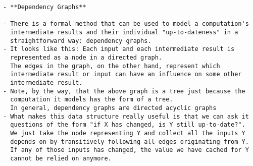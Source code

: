 \documentclass[12pt, a4paper]{report}
\begin{document}
\begin{verbatim}
- **Dependency Graphs**

- There is a formal method that can be used to model a computation's
  intermediate results and their individual "up-to-dateness" in a
  straightforward way: dependency graphs.
- It looks like this: Each input and each intermediate result is
  represented as a node in a directed graph.
  The edges in the graph, on the other hand, represent which
  intermediate result or input can have an influence on some other
  intermediate result.
- Note, by the way, that the above graph is a tree just because the
  computation it models has the form of a tree.
  In general, dependency graphs are directed acyclic graphs
- What makes this data structure really useful is that we can ask it
  questions of the form "if X has changed, is Y still up-to-date?".
  We just take the node representing Y and collect all the inputs Y
  depends on by transitively following all edges originating from Y.
  If any of those inputs has changed, the value we have cached for Y
  cannot be relied on anymore.
\end{verbatim}
\end{document}
